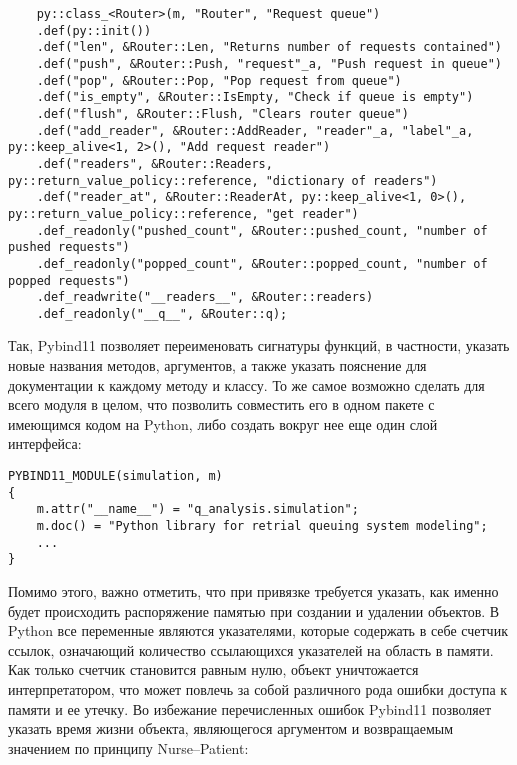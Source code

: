 \begin{lstlisting}
	py::class_<Router>(m, "Router", "Request queue")
	.def(py::init())
	.def("len", &Router::Len, "Returns number of requests contained")
	.def("push", &Router::Push, "request"_a, "Push request in queue")
	.def("pop", &Router::Pop, "Pop request from queue")
	.def("is_empty", &Router::IsEmpty, "Check if queue is empty")
	.def("flush", &Router::Flush, "Clears router queue")
	.def("add_reader", &Router::AddReader, "reader"_a, "label"_a, py::keep_alive<1, 2>(), "Add request reader")
	.def("readers", &Router::Readers, py::return_value_policy::reference, "dictionary of readers")
	.def("reader_at", &Router::ReaderAt, py::keep_alive<1, 0>(), py::return_value_policy::reference, "get reader")
	.def_readonly("pushed_count", &Router::pushed_count, "number of pushed requests")
	.def_readonly("popped_count", &Router::popped_count, "number of popped requests")
	.def_readwrite("__readers__", &Router::readers)
	.def_readonly("__q__", &Router::q);
\end{lstlisting}

Так, Pybind11 позволяет переименовать сигнатуры функций, в частности, указать новые названия методов, аргументов, а также указать пояснение для документации к каждому методу и классу. То же самое возможно сделать для всего модуля в целом, что позволить совместить его в одном пакете с имеющимся кодом на Python, либо создать вокруг нее еще один слой интерфейса:
\begin{lstlisting}
PYBIND11_MODULE(simulation, m)
{
	m.attr("__name__") = "q_analysis.simulation";
	m.doc() = "Python library for retrial queuing system modeling";
	...
}
\end{lstlisting}

 Помимо этого, важно отметить, что при привязке требуется указать, как именно будет происходить распоряжение памятью при создании и удалении объектов. В Python все переменные являются указателями, которые содержать в себе счетчик ссылок, означающий количество ссылающихся указателей на область в памяти. Как только счетчик становится равным нулю, объект уничтожается интерпретатором, что может повлечь за собой различного рода ошибки доступа к памяти и ее утечку. Во избежание перечисленных ошибок Pybind11 позволяет указать время жизни объекта, являющегося аргументом и возвращаемым значением по принципу Nurse--Patient:
 
